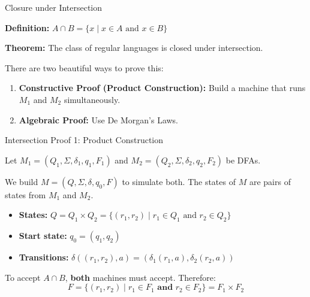 \documentclass[10pt,aspectratio=169]{beamer}
\begin{document}
\begin{frame}{Closure under Intersection}

\textbf{Definition:} $A \cap B = \{x \mid x \in A \text{ and } x \in B\}$

\vspace{1em}
\textbf{Theorem:} The class of regular languages is closed under intersection.

\vspace{1em}
\pause
There are two beautiful ways to prove this:
\begin{enumerate}
    \item \textbf{Constructive Proof (Product Construction):} Build a machine that runs $M_1$ and $M_2$ simultaneously.
    \item \textbf{Algebraic Proof:} Use De Morgan's Laws.
\end{enumerate}

\end{frame}

\begin{frame}{Intersection Proof 1: Product Construction}

Let $M_1 = (Q_1, \Sigma, \delta_1, q_1, F_1)$ and $M_2 = (Q_2, \Sigma, \delta_2, q_2, F_2)$ be DFAs.

\vspace{1em}
We build $M = (Q, \Sigma, \delta, q_0, F)$ to simulate both.
The states of $M$ are pairs of states from $M_1$ and $M_2$.

\vspace{1em}
\begin{itemize}
    \item \textbf{States:} $Q = Q_1 \times Q_2 = \{(r_1, r_2) \mid r_1 \in Q_1 \text{ and } r_2 \in Q_2\}$
    \item \textbf{Start state:} $q_0 = (q_1, q_2)$
    \item \textbf{Transitions:} $\delta((r_1, r_2), a) = (\delta_1(r_1, a), \delta_2(r_2, a))$
\end{itemize}

\vspace{1em}
\pause
To accept $A \cap B$, \textbf{both} machines must accept.
Therefore:
\[
F = \{(r_1, r_2) \mid r_1 \in F_1 \textbf{ and } r_2 \in F_2\} = F_1 \times F_2
\]

\end{frame}
\end{document}

